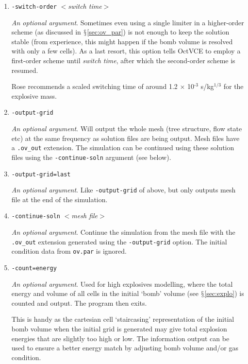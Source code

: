 \documentclass[pdftex, 12pt, a4paper]{report}
\begin{document}
\begin{enumerate}
\item \verb'-switch-order' $<$\emph{switch time}$>$

\emph{An optional argument}.  Sometimes even using a single limiter in a higher-order scheme (as discussed 
in $\mathsection$\ref{sec:ov_par}) is not enough to keep the solution stable (from experience, this might happen if the bomb volume is 
resolved with only a few cells).  As a last resort, this option tells
OctVCE to employ a first-order scheme until \emph{switch time}, after which the second-order scheme is resumed.

Rose \cite[p.g. 61]{Rose:thesis} recommends a scaled switching time of around 1.2 $\times$ 10$^{\text{-3}}$ s/kg$^{\text{1/3}}$
for the explosive mass.

\item \verb'-output-grid'

\emph{An optional argument}.  Will output the whole mesh (tree structure, flow state etc) at the same frequency as solution files
are being output.  Mesh files have a \verb'.ov_out' extension.  The simulation can be continued using these solution files using 
the \verb'-continue-soln' argument (see below).  

\item \verb'-output-grid=last'

\emph{An optional argument}.  Like \verb'-output-grid' of above, but only outputs mesh file at the end of the simulation.

\item \verb'-continue-soln' $<$\emph{mesh file}$>$

\emph{An optional argument}.  Continue the simulation from the mesh file with the \verb'.ov_out' extension generated using
the \verb'-output-grid' option.  The initial condition data from \verb'ov.par' is ignored.

\item \verb'-count=energy'

\emph{An optional argument}.  Used for high explosives modelling, where the total energy and volume of all cells in the initial `bomb' 
volume (see $\mathsection$\ref{sec:explo}) is counted and output.  The program then exits.

This is handy as the cartesian cell `staircasing' representation of the initial bomb volume when the initial grid is generated may 
give total explosion energies that are slightly too high or low.  The information output can be used to ensure a better energy match
by adjusting bomb volume and/or gas condition.  
\end{enumerate}
\end{document}
